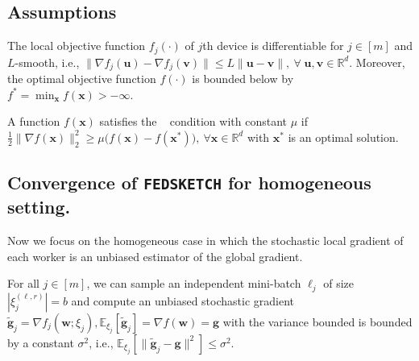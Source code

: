 \subsection{Assumptions}


\begin{assumption}\label{Assu:1}
The local objective function $f_j(\cdot)$ of $j$th device is differentiable for $j\in [m]$ and $L$-smooth, i.e., $\|\nabla f_j(\boldsymbol{u})-\nabla f_j(\mathbf{v})\|\leq L\|\boldsymbol{u}-\mathbf{v}\|,\: \forall \;\boldsymbol{u},\mathbf{v}\in\mathbb{R}^d$. Moreover, the optimal objective function $f(\cdot)$ is bounded below by ${f^*} = \min_{\boldsymbol{x}} f(\boldsymbol{x})>-\infty$. 
\end{assumption}

\begin{assumption}[\pl]\label{assum:pl}
A function $f(\boldsymbol{x})$ satisfies the \pl~ condition with constant $\mu$ if $\frac{1}{2}\|\nabla f(\boldsymbol{x})\|_2^2\geq \mu\big(f(\boldsymbol{x})-f(\boldsymbol{x}^*)\big),\: \forall \boldsymbol{x}\in\mathbb{R}^d $ with $\boldsymbol{x}^*$ is an optimal solution.
\end{assumption}


\subsection{Convergence of  \texttt{FEDSKETCH} for homogeneous setting.} 
Now we focus on the homogeneous case in which the stochastic local gradient of each worker is an unbiased estimator of the global gradient.


\begin{assumption}\label{Assu:1.5}
For all $j\in [m]$, we can sample an independent mini-batch $\ell_j$   of size $|\xi_j^{(\ell,r)}| = b$ and compute an unbiased stochastic gradient  $\tilde{\mathbf{g}}_j = \nabla f_j(\boldsymbol{w}; \xi_j), \mathbb{E}_{\xi_j}[\tilde{\mathbf{g}}_j] = \nabla f(\boldsymbol{w})=\mathbf{g}$ with  the variance bounded is bounded by a constant $\sigma^2$, i.e., $
\mathbb{E}_{\xi_j}\left[\|\tilde{\mathbf{g}}_j-\mathbf{g}\|^2\right]\leq \sigma^2$.
\end{assumption}


